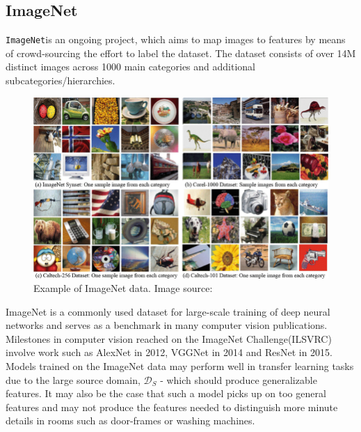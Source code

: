\subsection{ImageNet}
\texttt{ImageNet}\autocite{imagenet_cvpr09}is an ongoing project, which aims to map images to features by means of crowd-sourcing the effort to label the dataset. 
The dataset consists of over 14M distinct images across 1000 main categories and additional subcategories/hierarchies. 
\begin{figure}[H]
    \centering
    \includegraphics[scale=0.3]{pictures/random/imagenet}
    \caption{Example of ImageNet data. Image source: \autocite{imagenetex}}
    \label{fig:imagenetdata}
\end{figure}

\newline
ImageNet is a commonly used dataset for large-scale training of deep neural networks and serves as a benchmark in many computer vision publications.
Milestones in computer vision reached on the ImageNet Challenge(ILSVRC) involve work such as AlexNet in 2012, VGGNet\autocite{NIPS2012_4824} in 2014 and ResNet\autocite{ResNet2015} in 2015. 
\newline
Models trained on the ImageNet data may perform well in transfer learning tasks due to the large source domain, $\mathcal{D}_{S}$ - which should produce generalizable features. 
It may also be the case that such a model picks up on too general features and may not produce the features needed to distinguish more minute details in rooms such as door-frames or washing machines.
